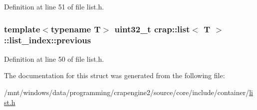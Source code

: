 Definition at line 51 of file list.\+h.

\hypertarget{structcrap_1_1list_1_1list__index_a16be27e9969e8256df96367d8de4c325}{
\subsubsection[{previous}]{\setlength{\rightskip}{0pt plus 5cm}template$<$typename T$>$ uint32\+\_\+t {\bf crap\+::list}$<$ T $>$\+::list\+\_\+index\+::previous}}\label{structcrap_1_1list_1_1list__index_a16be27e9969e8256df96367d8de4c325}


Definition at line 50 of file list.\+h.



The documentation for this struct was generated from the following file\+:\begin{DoxyCompactItemize}
\item 
/mnt/windows/data/programming/crapengine2/source/core/include/container/\hyperlink{list_8h}{list.\+h}\end{DoxyCompactItemize}
